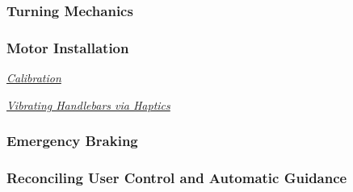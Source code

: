 \subsubsection{Turning Mechanics}

\subsubsection{Motor Installation}
\noindent \underline{\textit{Calibration}}

\noindent \underline{\textit{Vibrating Handlebars via Haptics}}

\subsubsection{Emergency Braking}

\subsubsection{Reconciling User Control and Automatic Guidance}
